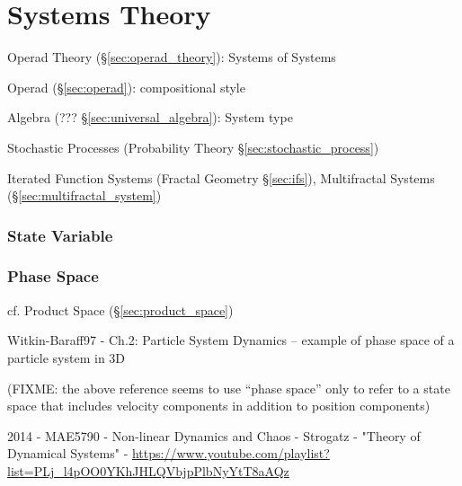 \part{Systems Theory}\label{sec:systems_theory}


Operad Theory (\S\ref{sec:operad_theory}): Systems of Systems

Operad (\S\ref{sec:operad}): compositional style

Algebra (??? \S\ref{sec:universal_algebra}): System type

Stochastic Processes (Probability Theory \S\ref{sec:stochastic_process})

Iterated Function Systems (Fractal Geometry \S\ref{sec:ifs}), Multifractal
Systems (\S\ref{sec:multifractal_system})



\section{State Variable}\label{sec:state_variable}

\section{Phase Space}\label{sec:phase_space}

cf. Product Space (\S\ref{sec:product_space})

Witkin-Baraff97 - Ch.2: Particle System Dynamics -- example of phase space of a
particle system in 3D

(FIXME: the above reference seems to use ``phase space'' only to refer to a
state space that includes velocity components in addition to position
components)

2014 - MAE5790 - Non-linear Dynamics and Chaos - Strogatz - "Theory of
Dynamical Systems" -
\url{https://www.youtube.com/playlist?list=PLj_l4pOO0YKhJHLQVbjpPlbNyYtT8aAQz}


